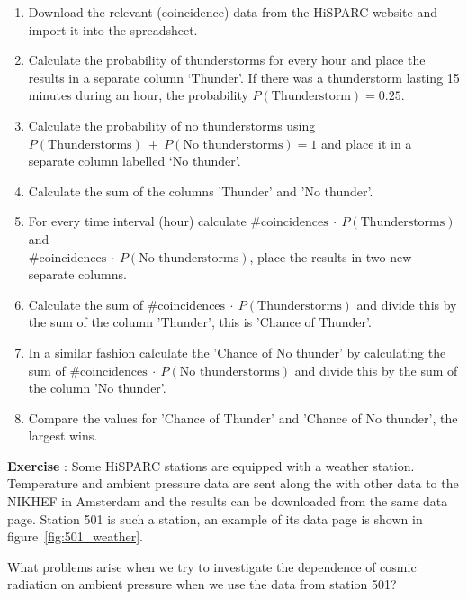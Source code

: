 \documentclass[12pt,a4paper]{article}
\numberwithin{equation}{section}
\numberwithin{figure}{section}
\newcounter{Exercise}
\numberwithin{table}{section}
\begin{document}
\begin{enumerate}[1]
\item Download the relevant (coincidence) data from the HiSPARC website and import it into the spreadsheet.
\item Calculate the probability of thunderstorms for every hour and place the results in a separate column `Thunder'. If there was a thunderstorm lasting 15 minutes during an hour, the probability $P(\mbox{Thunderstorm}) = 0.25$.
\item Calculate the probability of no thunderstorms using\\ $P(\mbox{Thunderstorms})~+~P(\mbox{No thunderstorms}) = 1$ and place it in a separate column labelled `No thunder'.
\item Calculate the sum of the columns 'Thunder' and 'No thunder'.
\item For every time interval (hour) calculate $\mbox{\#coincidences} ~\cdot~  P(\mbox{Thunderstorms})$ and \\$\mbox{\#coincidences} ~\cdot~ P(\mbox{No thunderstorms})$, place the results in two new separate columns.
\item Calculate the sum of $\mbox{\#coincidences} ~\cdot~ P(\mbox{Thunderstorms})$ and divide this by the sum of the column 'Thunder', this is 'Chance of Thunder'.
\item In a similar fashion calculate the 'Chance of No thunder' by calculating the sum of $\mbox{\#coincidences} ~\cdot~ P(\mbox{No thunderstorms})$ and divide this by the sum of the column 'No thunder'.
\item Compare the values for 'Chance of Thunder' and 'Chance of No thunder', the largest wins.
\end{enumerate}

\begin{shaded}
\textbf{Exercise \theExercise {}} : Some HiSPARC stations are equipped with a weather station. Temperature and ambient pressure data are sent along the with other data to the NIKHEF in Amsterdam and the results can be downloaded from the same data page. Station 501 is such a station, an example of its data page is shown in figure~\ref{fig:501_weather}.

What problems arise when we try to investigate the dependence of cosmic radiation on ambient pressure when we use the data from station 501?
\end{shaded}
\end{document}
